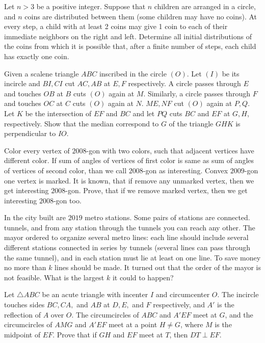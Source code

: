 \documentclass[11pt]{scrartcl}
\begin{document}
\begin{problem}[931951248564234]
Let $n > 3$ be a positive integer. Suppose that $n$ children are arranged in a circle, and $n$ coins are distributed between them (some children may have no coins). At every step, a child with at least 2 coins may give 1 coin to each of their immediate neighbors on the right and left. Determine all initial distributions of the coins from which it is possible that, after a finite number of steps, each child has exactly one coin.
\end{problem}
\begin{problem}[86986480818494]
Given a scalene triangle $ABC$ inscribed in the circle $(O)$. Let $(I)$ be its incircle and $BI,CI$ cut $AC,AB$ at $E,F$ respectively. A circle passes through $E$ and touches $OB$ at $B$ cuts $(O)$ again at $M$. Similarly, a circle passes through $F$ and touches $OC$ at $C$ cuts $(O)$ again at $N$. $ME,NF$ cut $(O)$ again at $P,Q$. Let $K$ be the intersection of $EF$ and $BC$ and let $PQ$ cuts $BC$ and $EF$ at $G,H$, respectively. Show that the median correspond to $G$ of the triangle $GHK$ is perpendicular to $IO$.
\end{problem}
\begin{problem}[8757490679465390171]
	Color every vertex of $2008$-gon with two colors, such that adjacent vertices have different color. If sum of angles of vertices of first color is same as sum of angles of vertices of second color, than we call $2008$-gon as interesting.
Convex $2009$-gon one vertex is marked. It is known, that if remove any unmarked vertex, then we get interesting $2008$-gon. Prove, that if we remove marked vertex, then we get interesting $2008$-gon too.
\end{problem}
\begin{problem}[175452544956824]
In the city built are $2019$ metro stations. Some pairs of stations are connected. tunnels, and from any station through the tunnels you can reach any other. The mayor ordered to organize several metro lines: each line should include several different stations connected in series by tunnels (several lines can pass through the same tunnel), and in each station must lie at least on one line. To save money no more than $k$ lines should be made. It turned out that the order of the mayor is not feasible. What is the largest $k$ it could to happen?
\end{problem}
\begin{problem}[456772085666528]
Let $\triangle ABC$ be an acute triangle with incenter $I$ and circumcenter $O$. The incircle touches sides $BC,CA,$ and $AB$ at $D,E,$ and $F$ respectively, and $A'$ is the reflection of $A$ over $O$. The circumcircles of $ABC$ and $A'EF$ meet at $G$, and the circumcircles of $AMG$ and $A'EF$ meet at a point $H\neq G$, where $M$ is the midpoint of $EF$. Prove that if $GH$ and $EF$ meet at $T$, then $DT\perp EF$.
\end{problem}
\end{document}
